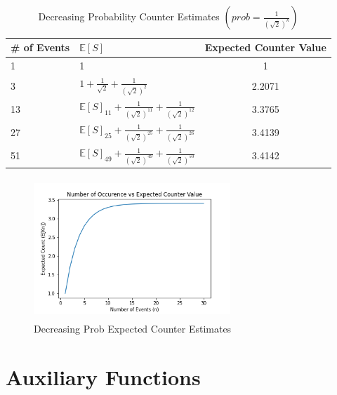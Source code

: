 \documentclass[longpaper, english, final, times]{revdetua}
\begin{document}
		\begin{table}[b!]
			\label{table:decreasingProbCounterExpectedEstimate}
			\caption{Decreasing Probability Counter Estimates $\left(prob=\frac{1}{(\sqrt{2})^k}\right)$}
			{\def\arraystretch{2}%
				\begin{tabular}{l|l|c}
					\toprule
					\# of Events & $\mathbb{E}[S]$ & Expected Counter Value\\
					\hline
					1 & 1 & 1 \\
					3 & $1+\frac{1}{\sqrt{2}}+\frac{1}{(\sqrt{2})^2}$&2.2071\\
					13 & $\mathbb{E}[S]_{11}+\frac{1}{(\sqrt{2})^{11}}+\frac{1}{(\sqrt{2})^{12}}$&3.3765 \\
					27 & $\mathbb{E}[S]_{25}+\frac{1}{(\sqrt{2})^{25}}+\frac{1}{(\sqrt{2})^{26}}$&3.4139 \\
					51 & $\mathbb{E}[S]_{49}+\frac{1}{(\sqrt{2})^{49}}+\frac{1}{(\sqrt{2})^{50}}$&3.4142 \\
				\end{tabular}
			}
		\end{table}
			
		\begin{figure}
			\begin{center}
				\label{figure:decreasingProb}
				\caption{Decreasing Prob Expected Counter Estimates}
				\includegraphics[width=280px, height=200px]{imgs/decreasing.png}
			\end{center}		
		\end{figure}
	
	\section{Auxiliary Functions}
	
		
	
\end{document}
